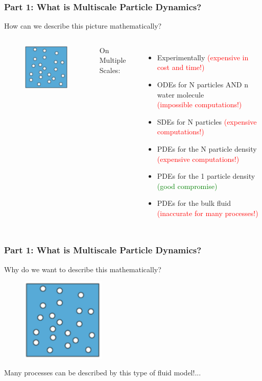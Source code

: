 \documentclass[aspectratio=169,xcolor=dvipsnames]{beamer}
\begin{document}
\begin{frame}
	\frametitle{Part 1: What is Multiscale Particle Dynamics?}
	How can we describe this picture mathematically?\\
	\vspace{1cm}
	\begin{columns}
		
		\begin{figure}
			\includegraphics[width=4cm]{Particles3.png}
		\end{figure}
	      On Multiple Scales:
		\begin{itemize}
			\item Experimentally \textcolor{red}{(expensive in cost and time!)}
			\item ODEs for N particles AND n water molecule\\ \textcolor{red}{(impossible computations!)}
			\item SDEs for N particles \textcolor{red}{(expensive computations!)}
			\item PDEs for the N particle density  \textcolor{red}{(expensive computations!)}
			\item PDEs for the 1 particle density \textcolor{green}{(good compromise)}
			\item PDEs for the bulk fluid \textcolor{red}{(inaccurate for many processes!)}
		\end{itemize}
	\end{columns}
\end{frame}

\begin{frame}
	\frametitle{Part 1: What is Multiscale Particle Dynamics?}
Why do we want to describe this mathematically?

	
	\begin{figure}
		\includegraphics[width=4cm]{Particles3.png}
	\end{figure}

Many processes can be described by this type of fluid model!...
\end{frame}
\end{document}

